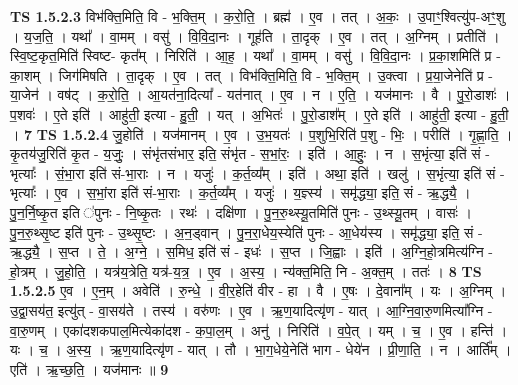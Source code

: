 \documentclass[17pt]{extarticle}
\begin{document}
                  \newline
                                \textbf{ TS 1.5.2.3} \newline
                  विभ॑क्ति॒मिति॒ वि - भ॒क्ति॒म् । क॒रो॒ति॒ । ब्रह्म॑ । ए॒व । तत् । अ॒कः॒ । उ॒पाꣳ॒॒श्वित्यु॑प-अꣳ॒॒शु । य॒ज॒ति॒ । यथा᳚ । वा॒मम् । वसु॑ । वि॒वि॒दा॒नः । गूह॑ति । ता॒दृक् । ए॒व । तत् । अ॒ग्निम् । प्रतीति॑ । स्वि॒ष्ट॒कृत॒मिति॑ स्विष्ट- कृत᳚म् । निरिति॑ । आ॒ह॒ । यथा᳚ । वा॒मम् । वसु॑ । वि॒वि॒दा॒नः । प्र॒का॒शमिति॑ प्र - का॒शम् । जिग॑मिषति । ता॒दृक् । ए॒व । तत् । विभ॑क्ति॒मिति॒ वि - भ॒क्ति॒म् । उ॒क्त्वा । प्र॒या॒जेनेति॑ प्र - या॒जेन॑ । वष॑ट् । क॒रो॒ति॒ । आ॒यत॑ना॒दित्या᳚ - यत॑नात् । ए॒व । न । ए॒ति॒ । यज॑मानः । वै । पु॒रो॒डाशः॑ । प॒शवः॑ । ए॒ते इति॑ । आहु॑ती॒ इत्या - हु॒ती॒ । यत् । अ॒भितः॑ । पु॒रो॒डाश᳚म् । ए॒ते इति॑ । आहु॑ती॒ इत्या - हु॒ती॒ । \textbf{  7} \newline
                  \newline
                                \textbf{ TS 1.5.2.4} \newline
                  जु॒होति॑ । यज॑मानम् । ए॒व । उ॒भ॒यतः॑ । प॒शुभि॒रिति॑ प॒शु - भिः॒ । परीति॑ । गृ॒ह्णा॒ति॒ । कृ॒तय॑जु॒रिति॑ कृ॒त - य॒जुः॒ । संभृ॑तसंभार॒ इति॒ संभृ॑त - स॒भां॒रः॒ । इति॑ । आ॒हुः॒ । न । स॒भृंत्या॒ इति॑ सं - भृत्याः᳚ । सं॒भा॒रा इति॑ सं-भा॒राः । न । यजुः॑ । क॒र्त॒व्य᳚म् । इति॑ । अथा॒ इति॑ । खलु॑ । स॒भृंत्या॒ इति॑ सं - भृत्याः᳚ । ए॒व । स॒भां॒रा इति॑ सं-भा॒राः । क॒र्त॒व्य᳚म् । यजुः॑ । य॒ज्ञ्स्य॑ । समृ॑द्ध्या॒ इति॒ सं - ऋ॒द्ध्यै॒ । पु॒न॒र्नि॒ष्कृ॒त इति ॑पुनः - नि॒ष्कृ॒तः । रथः॑ । दक्षि॑णा । पु॒न॒रु॒थ्स्यू॒तमिति॑ पुनः - उ॒थ्स्यू॒तम् । वासः॑ । पु॒न॒रु॒थ्सृ॒ष्ट इति॑ पुनः - उ॒थ्सृ॒ष्टः । अ॒न॒ड्वान् । पु॒न॒रा॒धेय॒स्येति॑ पुनः - आ॒धेय॑स्य । समृ॑द्ध्या॒ इति॒ सं - ऋ॒द्ध्यै॒ । स॒प्त । ते॒ । अ॒ग्ने॒ । स॒मिध॒ इति॑ सं - इधः॑ । स॒प्त । जि॒ह्वाः । इति॑ । अ॒ग्नि॒हो॒त्रमित्य॑ग्नि - हो॒त्रम् । जु॒हो॒ति॒ । यत्र॑य॒त्रेति॒ यत्र॑-य॒त्र॒ । ए॒व । अ॒स्य॒ । न्य॑क्त॒मिति॒ नि - अ॒क्त॒म् । ततः॑ । \textbf{  8} \newline
                  \newline
                                \textbf{ TS 1.5.2.5} \newline
                  ए॒व । ए॒न॒म् । अवेति॑ । रु॒न्धे॒ । वी॒र॒हेति॑ वीर - हा । वै । ए॒षः । दे॒वाना᳚म् । यः । अ॒ग्निम् । उ॒द्वा॒सय॑त॒ इत्यु॑त् - वा॒सय॑ते । तस्य॑ । वरु॑णः । ए॒व । ऋ॒ण॒यादित्यृ॑ण - यात् । आ॒ग्नि॒वा॒रु॒णमित्या᳚ग्नि - वा॒रु॒णम् । एका॑दशकपाल॒मित्येका॑दश - क॒पा॒ल॒म् । अनु॑ । निरिति॑ । व॒पे॒त् । यम् । च॒ । ए॒व । हन्ति॑ । यः । च॒ । अ॒स्य॒ । ऋ॒ण॒यादित्यृ॑ण - यात् । तौ । भा॒ग॒धेये॒नेति॑ भाग - धेये॑न । प्री॒णा॒ति॒ । न । आर्ति᳚म् । एति॑ । ऋ॒च्छ॒ति॒ । यज॑मानः ॥ \textbf{  9} \newline
\end{document}
